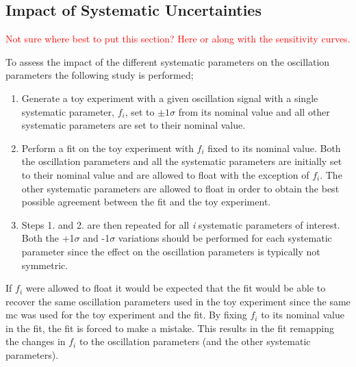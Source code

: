 \clearpage
\subsection{Impact of Systematic Uncertainties}

\textcolor{red}{Not sure where best to put this section? Here or along with the sensitivity curves.}

To assess the impact of the different systematic parameters on the oscillation parameters the following study is performed;
\begin{enumerate}
    \item Generate a toy experiment with a given oscillation signal with a single systematic parameter, $f_i$, set to $\pm1\sigma$ from its nominal value and all other systematic parameters are set to their nominal value.
    \item Perform a fit on the toy experiment with $f_i$ fixed to its nominal value. Both the oscillation parameters and all the systematic parameters are initially set to their nominal value and are allowed to float with the exception of $f_i$. The other systematic parameters are allowed to float in order to obtain the best possible agreement between the fit and the toy experiment.
    \item Steps 1. and 2. are then repeated for all \textit{i} systematic parameters of interest. Both the +1$\sigma$ and -1$\sigma$ variations should be performed for each systematic parameter since the effect on the oscillation parameters is typically not symmetric.  
\end{enumerate}
If $f_i$ were allowed to float it would be expected that the fit would be able to recover the same oscillation parameters used in the toy experiment since the same \gls{mc} was used for the toy experiment and the fit. By fixing $f_i$ to its nominal value in the fit, the fit is forced to make a mistake. This results in the fit remapping the changes in $f_i$ to the oscillation parameters (and the other systematic parameters). 

